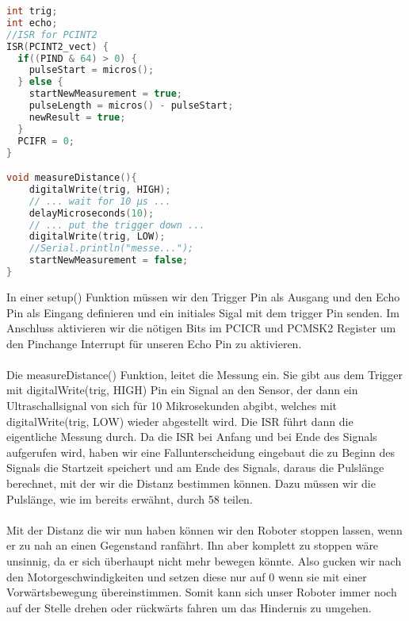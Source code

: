 \documentclass{article}
\begin{document}
\begin{file}[HC-SR04]
		
        \begin{lstlisting}[language=C++, inputencoding={utf8}, extendedchars=false]   
int trig;
int echo;
//ISR for PCINT2
ISR(PCINT2_vect) {
  if((PIND & 64) > 0) {
    pulseStart = micros();
  } else {
    startNewMeasurement = true;
    pulseLength = micros() - pulseStart;
    newResult = true;
  }
  PCIFR = 0;
}

void measureDistance(){   
    digitalWrite(trig, HIGH);
    // ... wait for 10 µs ...
    delayMicroseconds(10);
    // ... put the trigger down ...    
    digitalWrite(trig, LOW);     
    //Serial.println("messe...");
    startNewMeasurement = false;    
}
        \end{lstlisting}
        
\end{file}
In einer setup() Funktion müssen wir den Trigger Pin als Ausgang und den Echo Pin als Eingang definieren und ein initiales Sigal mit dem trigger Pin senden. Im Anschluss aktivieren wir die nötigen Bits im PCICR und PCMSK2 Register um den Pinchange Interrupt für unseren Echo Pin zu aktivieren.\\
\\
Die measureDistance() Funktion, leitet die Messung ein. Sie gibt aus dem Trigger mit digitalWrite(trig, HIGH) Pin ein Signal an den Sensor, der dann ein Ultraschallsignal von sich für 10 Mikrosekunden abgibt, welches mit digitalWrite(trig, LOW) wieder abgestellt wird. Die ISR führt dann die eigentliche Messung durch. Da die ISR bei Anfang und bei Ende des Signals aufgerufen wird, haben wir eine Fallunterscheidung eingebaut die zu Beginn des Signals die Startzeit speichert und am Ende des Signals, daraus die Pulslänge berechnet, mit der wir die Distanz bestimmen können. Dazu müssen wir die Pulslänge, wie im bereits erwähnt, durch 58 teilen.\\
\\
Mit der Distanz die wir nun haben können wir den Roboter stoppen lassen, wenn er zu nah an einen Gegenstand ranfährt. Ihn aber komplett zu stoppen wäre unsinnig, da er sich überhaupt nicht mehr bewegen könnte. Also gucken wir nach den Motorgeschwindigkeiten und setzen diese nur auf 0 wenn sie mit einer Vorwärtsbewegung übereinstimmen. Somit kann sich unser Roboter immer noch auf der Stelle drehen oder rückwärts fahren um das Hindernis zu umgehen. 

\newpage





\end{document}
